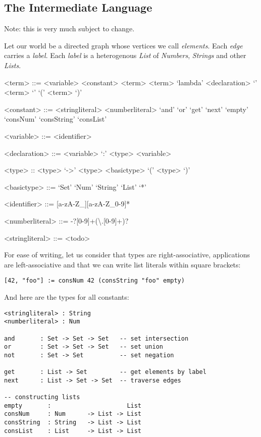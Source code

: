\documentclass[main.tex]{subfiles}
\begin{document}
\subsection{The Intermediate Language}
Note: this is very much subject to change.

Let our world be a directed graph whose vertices we call \emph{elements}.
Each \emph{edge} carries a \emph{label}. Each \emph{label} is a heterogenous
\emph{List} of \emph{Numbers}, \emph{Strings} and other \emph{Lists}.

\begin{grammar}

<term> ::= <variable>
\alt <constant>
\alt <term> <term>
\alt `lambda' <declaration> `{' <term> `}'
\alt `(' <term> `)'

<constant> ::= <stringliteral>
          \alt <numberliteral>
          \alt `and'
          \alt `or'
          \alt `get'
          \alt `next'
          \alt `empty'
          \alt `consNum'
          \alt `consString'
          \alt `consList'


<variable> ::= <identifier>

<declaration> ::= <variable> `:' <type>
\alt <variable>

<type> :: <type> `->' <type>
\alt <basictype>
\alt `(' <type> `)'

<basictype> ::= `Set'
\alt `Num'
\alt `String'
\alt `List'
\alt `*'

<identifier> ::= [a-zA-Z_][a-zA-Z_0-9]*

<numberliteral>     ::= -?[0-9]+(\textbackslash.[0-9]+)?

<stringliteral>     ::= <todo>
\end{grammar}

For ease of writing, let us consider that types are right-associative,
applications are left-associative and that we can write list literals
within square brackets:
\begin{lstlisting}
[42, "foo"] := consNum 42 (consString "foo" empty)
\end{lstlisting}

And here are the types for all constants:

\begin{lstlisting}
<stringliteral> : String
<numberliteral> : Num

and       : Set -> Set -> Set   -- set intersection
or        : Set -> Set -> Set   -- set union
not       : Set -> Set          -- set negation

get       : List -> Set         -- get elements by label
next      : List -> Set -> Set  -- traverse edges

-- constructing lists
empty       :                     List
consNum     : Num      -> List -> List
consString  : String   -> List -> List
consList    : List     -> List -> List

\end{lstlisting}
\end{document}
